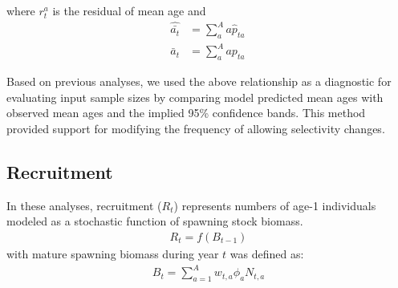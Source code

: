 \documentclass[11pt,
  english,
  a4paper,
]{article}
\begin{document}
\leavevmode\tagmcend\tagstructend\par


where {\(r^a_t\)\leavevmode\tagmcend\tagstructend} is the residual of mean age and \begin{align}
\hat{\bar{a_t}} &= \sum_a^A{a \hat p_{ta}}\, \\
{\bar a_t}      &= \sum_a^A{a p_{ta}}\, 
\end{align}

\leavevmode\tagmcend\tagstructend\par


Based on previous analyses, we used the above relationship as a diagnostic for evaluating input sample sizes by comparing model predicted mean ages with observed mean ages and the implied 95\% confidence bands. This method provided support for modifying the frequency of allowing selectivity changes.

\leavevmode\tagmcend\tagstructend\par


\hypertarget{recruitment-1}{%
\subsection{Recruitment}\label{recruitment-1}}

\leavevmode\tagmcend\tagstructend


In these analyses, recruitment ({\(R_t\)\leavevmode\tagmcend\tagstructend}) represents numbers of age-1 individuals modeled as a stochastic function of spawning stock biomass. \begin{align}
        R_t = f\left(B_{t-1} \right)
\end{align} with mature spawning biomass during year {\(t\)\leavevmode\tagmcend\tagstructend} was defined as: \begin{align}
  B_t = \sum_{a=1}^A{ w_{t,a}\phi_aN_{t,a}} 
\end{align}

\leavevmode\tagmcend\tagstructend\par
\end{document}
